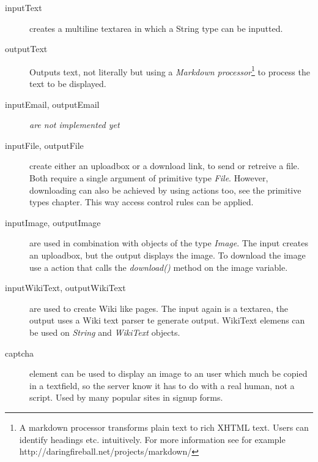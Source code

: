 \begin{description}
	\item[inputText] creates a multiline textarea in which a String type can be inputted. 
	\item[outputText]Outputs text, not literally but using a \emph{Markdown processor}\footnote{A markdown processor transforms plain text to rich XHTML text. Users can identify headings etc. intuitively. For more information see for example http://daringfireball.net/projects/markdown/} to process the text to be displayed. 
	\item[inputEmail, outputEmail] \emph{are not implemented yet}
	\item[inputFile, outputFile]create either an uploadbox or a download link, to send or retreive a file. Both require a single argument of primitive type \emph{File}. However, downloading can also be achieved by using actions too, see the primitive types chapter. This way access control rules can be applied. 
	\item[inputImage, outputImage] are used in combination with objects of the type \emph{Image}. The input creates an uploadbox, but the output displays the image. To download the image use a action that calls the \emph{download()} method on the image variable. 
	\item[inputWikiText, outputWikiText] are used to create Wiki like pages. The input again is a textarea, the output uses a Wiki text parser te generate output. WikiText elemens can be used on \emph{String} and \emph{WikiText} objects. 
	\item[captcha] element can be used to display an image to an user which much be copied in a textfield, so the server know it has to do with a real human, not a script. Used by many popular sites in signup forms. 
\end{description}

